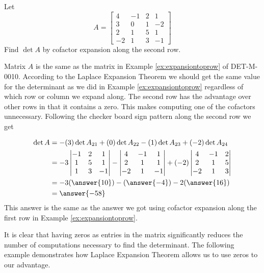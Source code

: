 \documentclass{ximera}
\begin{document}
 \begin{example}
Let  
$$A=\begin{bmatrix}4&-1&2&1\\3&0&1&-2\\
2&1&5&1\\-2&1&3&-1\end{bmatrix}$$
Find $\det{A}$ by cofactor expansion along the second row.
\begin{explanation}
Matrix $A$ is the same as the matrix in Example \ref{ex:expansiontoprow} of DET-M-0010.  According to the Laplace Expansion Theorem we should get the same value for the determinant as we did in Example \ref{ex:expansiontoprow} regardless of which row or column we expand along.  The second row has the advantage over other rows in that it contains a zero.  This makes computing one of the cofactors unnecessary.  Following the checker board sign pattern along the second row we get

\begin{align*}
\det{A}&=-(3)\det{A_{21}}+(0)\det{A_{22}}-(1)\det{A_{23}}+(-2)\det{A_{24}}\\
&=-3\begin{vmatrix}-1&2&1\\1&5&1\\1&3&-1\end{vmatrix}-\begin{vmatrix}4&-1&1\\2&1&1\\-2&1&-1\end{vmatrix}+(-2)\begin{vmatrix}4&-1&2\\2&1&5\\-2&1&3\end{vmatrix}\\&=-3(\answer{10})-(\answer{-4})-2(\answer{16})\\
&=\answer{-58}
\end{align*}
This answer is the same as the answer we got using cofactor expansion along the first row in Example \ref{ex:expansiontoprow}.
\end{explanation}
 \end{example}
 
It is clear that having zeros as entries in the matrix significantly reduces the number of computations necessary to find the determinant.  The following example demonstrates how Laplace Expansion Theorem allows us to use zeros to our advantage.
\end{document}
